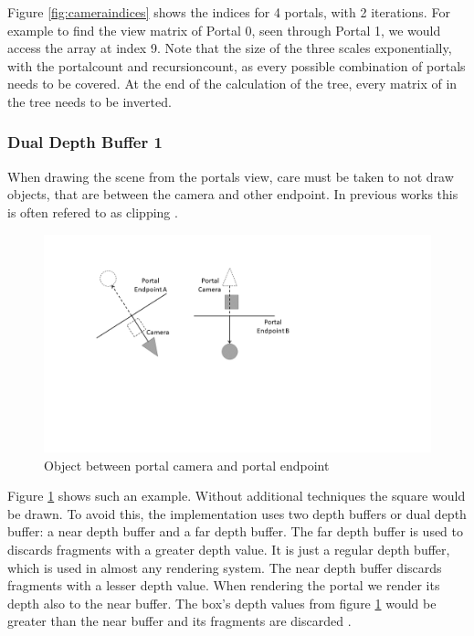 Figure \ref{fig:cameraindices} shows the indices for 4 portals, with 2 iterations. For example to find the view matrix of Portal 0, seen through Portal 1, we would access the array at index 9. Note that the size of the three scales exponentially, with the \gls{portalcount} and \gls{recursioncount}, as every possible combination of portals needs to be covered. At the end of the calculation of the tree, every matrix of in the tree needs to be inverted.


\subsubsection{Dual Depth Buffer 1}

When drawing the scene from the portals view, care must be taken to not draw objects, that are between the camera and other endpoint. In previous works this is often refered to as clipping \cite{lowe:2005:technique}.
\begin{figure}[h]
	\includegraphics[width=\linewidth]{images/bananajuce.png}
	\caption{Object between portal camera and portal endpoint}
	\label{fig:bananajuce}
\end{figure}

Figure \ref{fig:bananajuce} shows such an example. Without additional techniques the square would be drawn. To avoid this, the implementation uses two depth buffers or dual depth buffer: a near depth buffer and a far depth buffer. The far depth buffer is used to discards fragments with a greater depth value. It is just a regular depth buffer, which is used in almost any rendering system. The near depth buffer discards fragments with a lesser depth value. When rendering the portal we render its depth also to the near buffer. The box's depth values from figure \ref{fig:bananajuce} would be greater than the near buffer and its fragments are discarded \cite{lowe:2005:technique, ropinski:2004:real}.

